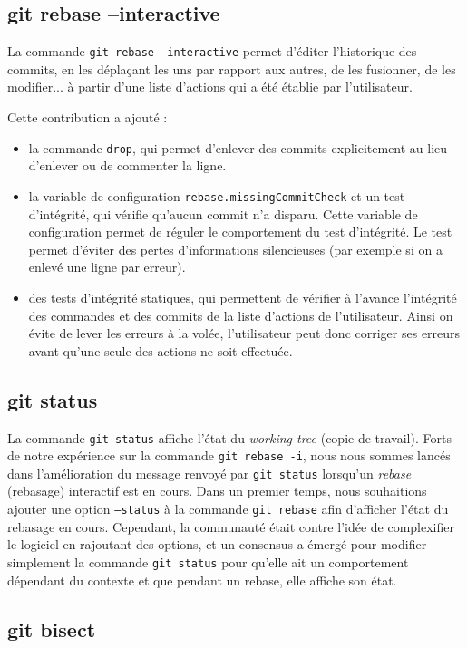 \documentclass[a4paper, 12pt]{article}
\newcommand{\gitcmd}[1]{\texttt{#1}}
\begin{document}
\subsection{git rebase --interactive}

La commande \gitcmd{git rebase --interactive} permet d'éditer l'historique des commits, en les déplaçant les uns par rapport aux autres, de les fusionner, de les modifier... à partir d'une liste d'actions qui a été établie par l'utilisateur.

Cette contribution a ajouté :
\begin{itemize}
\item la commande \gitcmd{drop}, qui permet d'enlever des commits explicitement au lieu d'enlever ou de commenter la ligne.
\item la variable de configuration \gitcmd{rebase.missingCommitCheck} et un test d'intégrité, qui vérifie qu'aucun commit n'a disparu. Cette variable de configuration permet de réguler le comportement du test d'intégrité. Le test permet d'éviter des pertes d'informations silencieuses (par exemple si on a enlevé une ligne par erreur).
\item des tests d'intégrité statiques, qui permettent de vérifier à l'avance l'intégrité des commandes et des commits de la liste d'actions de l'utilisateur. Ainsi on évite de lever les erreurs à la volée, l'utilisateur peut donc corriger ses erreurs avant qu'une seule des actions ne soit effectuée.
\end{itemize}

\subsection{git status}

La commande \gitcmd{git status} affiche l'état du \textit{working tree} (copie de travail).
Forts de notre expérience sur la commande \gitcmd{git rebase -i}, nous nous sommes lancés dans l'amélioration du message renvoyé par \gitcmd{git status} lorsqu'un \textit{rebase} (rebasage) interactif est en cours.
Dans un premier temps, nous souhaitions ajouter une option \gitcmd{--status} à la commande \gitcmd{git rebase} afin d'afficher l'état du rebasage en cours. 
Cependant, la communauté était contre l'idée de complexifier le logiciel en rajoutant des options, et un consensus a émergé pour modifier simplement la commande \gitcmd{git status} pour qu'elle ait un comportement dépendant du contexte et que pendant un rebase, elle affiche son état.

\subsection{git bisect}
\end{document}
